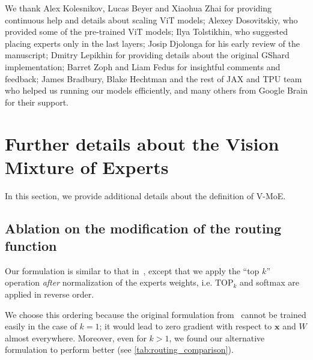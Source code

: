 \documentclass{article}
\newcommand{\abbv}{{V-MoE}}
\begin{document}
 
\clearpage

\begin{ack}
We thank Alex Kolesnikov, Lucas Beyer and Xiaohua Zhai for providing continuous help and details about scaling ViT models;
Alexey Dosovitskiy, who provided some of the pre-trained ViT models;
Ilya Tolstikhin, who suggested placing experts only in the last layers;
Josip Djolonga for his early review of the manuscript;
Dmitry Lepikhin for providing details about the original GShard implementation;
Barret Zoph and Liam Fedus for insightful comments and feedback;
James Bradbury, Blake Hechtman and the rest of JAX and TPU team who helped us running our models efficiently,
and many others from Google Brain for their support.
\end{ack}







\clearpage
\appendix
\clearpage
\section{Further details about the Vision Mixture of Experts}
\label{sec:app_moe_model}

In this section, we provide additional details about the definition of \abbv{}.

\subsection{Ablation on the modification of the routing function}

Our formulation is similar to that in~\cite{shazeer2017outrageously}, except that we apply the ``top $k$'' operation \textit{after} normalization of the experts weights, i.e. $\text{TOP}_k$ and softmax are applied in reverse order.

We choose this ordering because the original formulation from~\cite{shazeer2017outrageously} cannot be trained easily in the case of $k=1$; it would lead to zero gradient with respect to $\mathbf{x}$ and $W$ almost everywhere.
Moreover, even for $k > 1$, we found our alternative formulation to perform better (see \cref{tab:routing_comparison}). 

\begin{table}
\begin{center}
\vspace*{3mm}
\caption{\label{tab:routing_comparison} Comparison of routing functions.}
\end{center}
\end{table}
\end{document}
